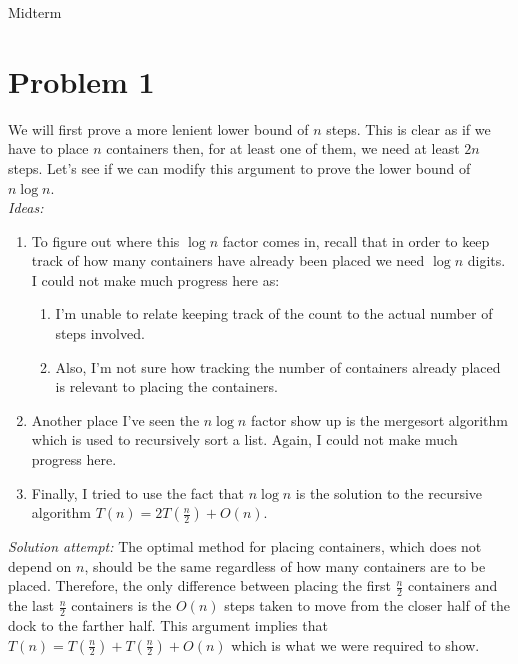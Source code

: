 \documentclass[usletter]{article}
\begin{document}
           {Midterm}   %
           



%
%
%
%
%

\section*{Problem 1}

We will first prove a more lenient lower bound of \(n\) steps. This is clear as if we have to place \(n\) containers then, for at least one of them,
we need at least \(2n\) steps. Let's see if we can modify this argument to prove the lower bound of \(n \log n\). \\

\emph{Ideas:}
\begin{enumerate}
    \item To figure out where this \(\log n\) factor comes in,
    recall that in order to keep track of how many containers have already been placed we need \(\log n\) digits. 
    I could not make much progress here as:
    \begin{enumerate}
        \item I'm unable to relate keeping track of the count to the actual number of steps involved.
        \item Also, I'm not sure how tracking the number of containers already placed is relevant to placing
        the containers. 
    \end{enumerate}
    \item Another place I've seen the \(n \log n \) factor show up is the mergesort algorithm which is used to recursively sort a list. 
    Again, I could not make much progress here. 
    \item Finally, I tried to use the fact that \(n\log n\) is the solution to the recursive algorithm \(T(n) = 2T(\frac{n}{2}) + O(n)\). 
\end{enumerate}

\emph{Solution attempt:} The optimal method for placing containers, which does not depend on \(n\), should be the same regardless of how many containers are to be placed. Therefore, the only difference between placing
the first \(\frac{n}{2}\) containers and the last \(\frac{n}{2}\) containers is the \(O(n)\) steps taken to move from the closer half of the dock to the farther half. This argument implies that \(T(n) = T(\frac{n}{2})+ T(\frac{n}{2}) + O(n)\)
which is what we were required to show. 
\end{document}
